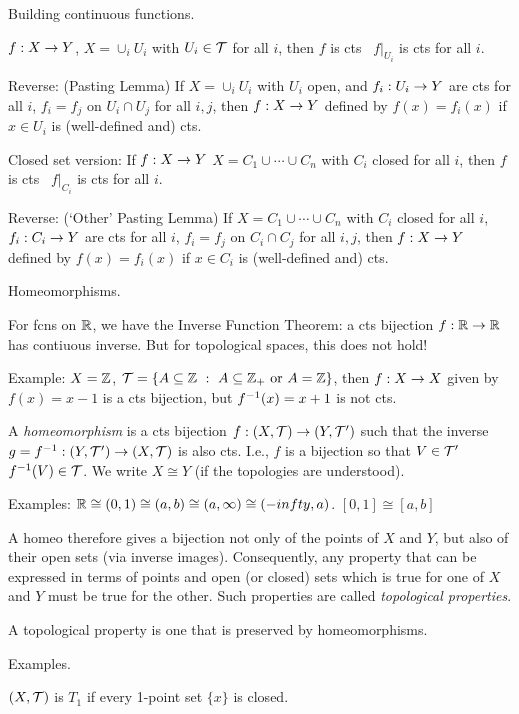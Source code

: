\documentclass[12pt]{article}
\begin{document}
\msk

Building continuous functions.

$f:X\rightarrow Y$, $X=\cup_iU_i$ with $U_i\in{\mathcal T}$ for all $i$, then 
$f$ is cts \lra\ $f|_{U_i}$ is cts for all $i$.

Reverse: (Pasting Lemma) If $X=\cup_iU_i$ with $U_i$ open, and $f_i:U_i\rightarrow Y$
are cts for all $i$,  $f_i=f_j$ on $U_i\cap U_j$ for all $i,j$, 
then $f:X\rightarrow Y$ defined by $f(x)=f_i(x)$ if $x\in U_i$ is (well-defined and)
cts.

Closed set version: If $f:X\rightarrow Y$
$X=C_1\cup\cdots\cup C_n$ with $C_i$ closed for all $i$,
then $f$ is cts \lra\ $f|_{C_i}$ is cts for all $i$.

Reverse: (`Other' Pasting Lemma) If $X=C_1\cup\cdots\cup C_n$ with $C_i$ closed for all $i$,
$f_i:C_i\rightarrow Y$ are cts for all $i$,  $f_i=f_j$ on $C_i\cap C_j$ for all $i,j$, 
then $f:X\rightarrow Y$ defined by $f(x)=f_i(x)$ if $x\in C_i$ is (well-defined and)
cts.

\msk

Homeomorphisms.

For fcns on ${\mathbb R}$, we have the Inverse Function Theorem: a cts bijection
$f:{\mathbb R}\rightarrow{\mathbb R}$ has contiuous inverse. But for topological spaces, this does
not hold!

Example: $X={\mathbb Z}$, $\mt = \{A\sset\bbz\ :\ A\sset\bbz_+\ \textrm{or}\ A=\bbz\}$, then 
$f:X\rightarrow X$ given by $f(x)=x-1$ is a cts bijection, but $f^{-1}(x)=x+1$ is not cts.

A {\it homeomorphism} is a cts bijection $f:(X,{\mathcal T})\rightarrow(Y,{\mathcal T}^\prime)$ such that 
the inverse $g=f^{-1}:(Y,{\mathcal T}^\prime)\rightarrow(X,{\mathcal T})$ is also cts. I.e., $f$ is a bijection
so that $V\in{\mathcal T}^\prime$ \lra\ $f^{-1}(V)\in{\mathcal T}$. We write $X\cong Y$ (if the topologies are
understood).

Examples: ${\mathbb R}\cong (0,1)\cong (a,b)\cong (a,\infty)\cong (-infty,a)$. 
$[0,1]\cong [a,b]$

A homeo therefore gives a bijection not only of the points of $X$ and $Y$, but also of 
their open sets (via inverse images). Consequently, any property that can
be expressed in terms of points and open (or closed) sets which is true for 
one of $X$ and $Y$ must be true for the other. Such properties are called
{\it topological properties}.

A topological property is one that is preserved by homeomorphisms.

Examples.

$(X,{\mathcal T})$ is $T_1$ if every 1-point set $\{x\}$ is closed.
\end{document}
